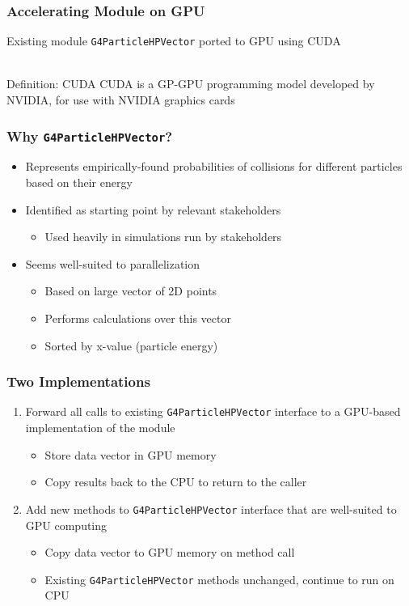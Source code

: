 \documentclass{beamer}
\begin{document}
\begin{frame}
\frametitle{Accelerating Module on GPU}
Existing module \texttt{G4ParticleHPVector} ported to GPU using CUDA\\~\\

\begin{block}{Definition: CUDA}
CUDA is a GP-GPU programming model developed by NVIDIA, for use with NVIDIA graphics cards
\end{block}
\end{frame}

\begin{frame}
\frametitle{Why \texttt{G4ParticleHPVector}?}
\begin{itemize}
\item Represents empirically-found probabilities of collisions for different particles based on their energy
\item Identified as starting point by relevant stakeholders
\begin{itemize}
\item Used heavily in simulations run by stakeholders
\end{itemize}
\item Seems well-suited to parallelization
\begin{itemize}
\item Based on large vector of 2D points
\item Performs calculations over this vector
\item Sorted by x-value (particle energy)
\end{itemize}
\end{itemize}
\end{frame}

\begin{frame}
\frametitle{Two Implementations}
\begin{enumerate}
\item Forward all calls to existing \texttt{G4ParticleHPVector} interface to a GPU-based implementation of the module

\begin{itemize}
\item Store data vector in GPU memory
\item Copy results back to the CPU to return to the caller
\end{itemize}

\item Add new methods to \texttt{G4ParticleHPVector} interface that are well-suited to GPU computing
\begin{itemize}
\item Copy data vector to GPU memory on method call
\item Existing \texttt{G4ParticleHPVector} methods unchanged, continue to run on CPU
\end{itemize}
\end{enumerate}
\end{frame}
\end{document}
